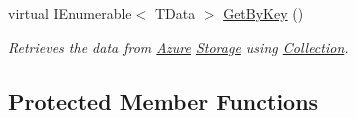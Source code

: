 \begin{DoxyCompactItemize}
virtual I\+Enumerable$<$ T\+Data $>$ \hyperlink{classCqrs_1_1Azure_1_1BlobStorage_1_1TableStorageStore_a7a6e253d7d4f6d40a2b59e804f68c5c4_a7a6e253d7d4f6d40a2b59e804f68c5c4}{Get\+By\+Key} ()
\begin{DoxyCompactList}\small\item\em Retrieves the data from \hyperlink{namespaceCqrs_1_1Azure}{Azure} \hyperlink{namespaceCqrs_1_1Azure_1_1Storage}{Storage} using \hyperlink{classCqrs_1_1Azure_1_1BlobStorage_1_1TableStorageStore_a97752ec9c5ad130a230924da9a75a537_a97752ec9c5ad130a230924da9a75a537}{Collection}. \end{DoxyCompactList}\end{DoxyCompactItemize}
\subsection*{Protected Member Functions}
